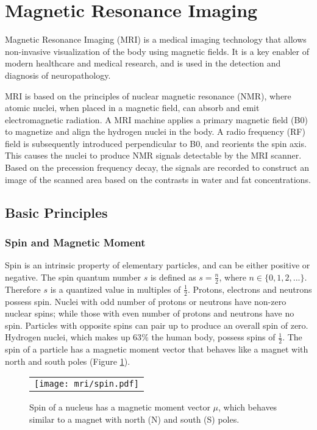 \section{Magnetic Resonance Imaging}
Magnetic Resonance Imaging (MRI) is a medical imaging technology that allows non-invasive visualization of the body using magnetic fields. It is a key enabler of modern healthcare and medical research, and is used in the detection and diagnosis of neuropathology.

MRI is based on the principles of nuclear magnetic resonance (NMR), where atomic nuclei, when placed in a magnetic field, can absorb and emit electromagnetic radiation. A MRI machine applies a primary magnetic field (B0) to magnetize and align the hydrogen nuclei in the body. A radio frequency (RF) field is subsequently introduced perpendicular to B0, and reorients the spin axis. This causes the nuclei to produce NMR signals detectable by the MRI scanner. Based on the precession frequency decay, the signals are recorded to construct an image of the scanned area based on the contrasts in water and fat concentrations. 

\subsection{Basic Principles}
\subsubsection{Spin and Magnetic Moment}
Spin is an intrinsic property of elementary particles, and can be either positive or negative. The spin quantum number  $s$ is defined as $ s = \frac{n}{2}$, where $n \in \{0,1,2,...\}$. Therefore $s$ is a quantized value in multiples of $\frac{1}{2}$. Protons, electrons and neutrons possess spin. Nuclei with odd number of protons or neutrons have non-zero nuclear spins; while those with even number of protons and neutrons have no spin. Particles with opposite spins can pair up to produce an overall spin of zero. Hydrogen nuclei, which makes up 63$\%$ the human body, possess spins of $\frac{1}{2}$. The spin of a particle has a magnetic moment vector that behaves like a magnet with north and south poles (Figure \ref{fig:spin}).


\begin{figure}[h]
\begin{center}
\begin{tabular}{c}
\texttt{[image: mri/spin.pdf]}
\end{tabular}
\caption{Spin of a nucleus has a magnetic moment vector $\mu$, which behaves similar to a magnet with north (N) and south (S) poles.}
\label{fig:spin}
\end{center}
\end{figure}

